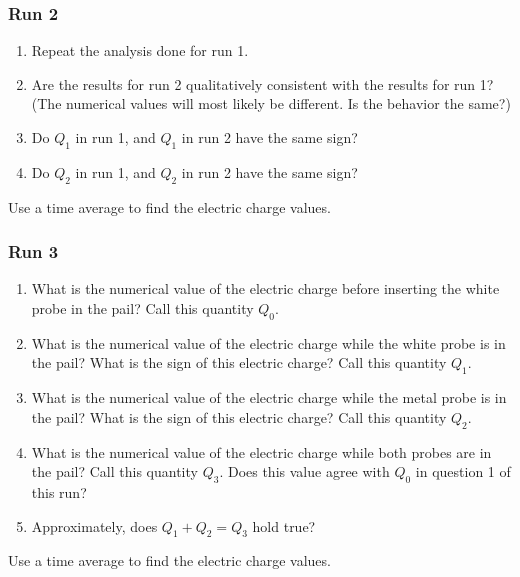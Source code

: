 \subsubsection{Run 2}
%
\begin{enumerate}
	\item Repeat the analysis done for run 1.
	\item Are the results for run 2 qualitatively consistent with the results for run 1? (The numerical values will most likely be different. Is the behavior the same?)
	\item Do $Q_{1}$ in run 1, and $Q_{1}$ in run 2 have the same sign?
	\item Do $Q_{2}$ in run 1, and $Q_{2}$ in run 2 have the same sign?
\end{enumerate}
Use a time average to find the electric charge values.
%
\subsubsection{Run 3}
%
\begin{enumerate}
	\item What is the numerical value of the electric charge before inserting the white probe in the pail? Call this quantity $Q_{0}$.
	\item What is the numerical value of the electric charge while the white probe is in the pail? What is the sign of this electric charge? Call this quantity $Q_{1}$.
	\item What is the numerical value of the electric charge while the metal probe is in the pail? What is the sign of this electric charge? Call this quantity $Q_{2}$.
	\item What is the numerical value of the electric charge while both probes are in the pail? Call this quantity $Q_{3}$. Does this value agree with $Q_{0}$ in question 1 of this run?
	\item Approximately, does $Q_{1} + Q_{2} = Q_{3}$ hold true?
\end{enumerate}
Use a time average to find the electric charge values.
%
